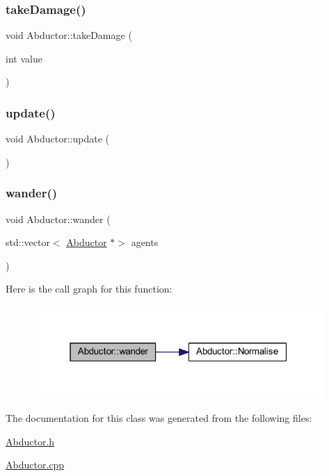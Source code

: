 \mbox{\label{class_abductor_aa7086d22f21d43097e7d51dd06b4b074}} 
\subsubsection{\texorpdfstring{take\+Damage()}{takeDamage()}}
{\footnotesize\ttfamily void Abductor\+::take\+Damage (\begin{DoxyParamCaption}\item[{int}]{value }\end{DoxyParamCaption})}

\mbox{\label{class_abductor_a1e3842b4fc70f8667b0e30f23bbce579}} 
\subsubsection{\texorpdfstring{update()}{update()}}
{\footnotesize\ttfamily void Abductor\+::update (\begin{DoxyParamCaption}{ }\end{DoxyParamCaption})}

\mbox{\label{class_abductor_a10a4ded56dcad749b1a1656688d135ea}} 
\subsubsection{\texorpdfstring{wander()}{wander()}}
{\footnotesize\ttfamily void Abductor\+::wander (\begin{DoxyParamCaption}\item[{std\+::vector$<$ \hyperlink{class_abductor}{Abductor} $\ast$$>$}]{agents }\end{DoxyParamCaption})}

Here is the call graph for this function\+:
\nopagebreak
\begin{figure}[H]
\begin{center}
\leavevmode
\includegraphics[width=313pt]{class_abductor_a10a4ded56dcad749b1a1656688d135ea_cgraph}
\end{center}
\end{figure}


The documentation for this class was generated from the following files\+:\begin{DoxyCompactItemize}
\item 
\hyperlink{_abductor_8h}{Abductor.\+h}\item 
\hyperlink{_abductor_8cpp}{Abductor.\+cpp}\end{DoxyCompactItemize}
